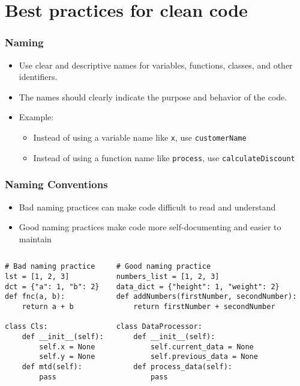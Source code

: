 \documentclass{beamer}
\begin{document}
\section{Best practices for clean code}

\begin{frame}[fragile]
\frametitle{Naming}

\begin{itemize}
\item Use clear and descriptive names for variables, functions, classes, and other identifiers.
\item The names should clearly indicate the purpose and behavior of the code.
\item Example:
\begin{itemize}
\item Instead of using a variable name like \texttt{x}, use \texttt{customerName}
\item Instead of using a function name like \texttt{process}, use \texttt{calculateDiscount}
\end{itemize}
\end{itemize}
\end{frame}

\begin{frame}[fragile] 
\frametitle{Naming Conventions}

\begin{itemize}
\item Bad naming practices can make code difficult to read and understand
\item Good naming practices make code more self-documenting and easier to maintain
\end{itemize}

\scriptsize
\begin{columns}
\begin{lstlisting}[style=Python]
# Bad naming practice
lst = [1, 2, 3]
dct = {"a": 1, "b": 2}
def fnc(a, b):
    return a + b

class Cls:
    def __init__(self):
        self.x = None
        self.y = None
    def mtd(self):
        pass
\end{lstlisting}
\begin{lstlisting}[style=Python]
# Good naming practice
numbers_list = [1, 2, 3]
data_dict = {"height": 1, "weight": 2}
def addNumbers(firstNumber, secondNumber):
    return firstNumber + secondNumber

class DataProcessor:
    def __init__(self):
        self.current_data = None
        self.previous_data = None
    def process_data(self):
        pass
\end{lstlisting}
\end{columns}
\end{frame}
\end{document}
